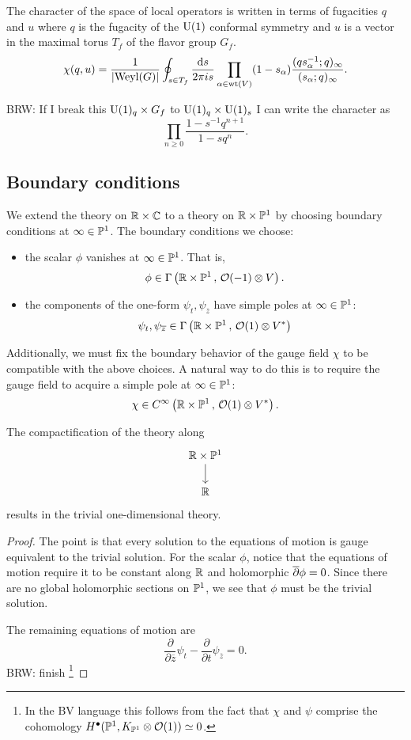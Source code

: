\documentclass[11pt]{amsart}
\def\zbar{{\overline{z}}}
\def\U{{\rm U}}
\def\brian#1{{\textcolor{blue!65!red}{BRW: {#1}}}}
\begin{document}
The character of the space of local operators is written in terms of fugacities $q$ and $u$ where $q$ is the fugacity of the $\U(1)$ conformal symmetry and $u$ is a vector in the maximal torus $T_f$ of the flavor group $G_f$. 
\[
\chi(q , u) = \frac{1}{|{\rm Weyl}(G)|} \oint_{s \in T_f} \frac{{\rm d} s}{2 \pi i s} \prod_{\alpha \in {\rm wt}(V)} (1-s_\alpha) \frac{(q s^{-1}_\alpha ; q)_\infty}{(s_\alpha ; q)_\infty} .
\]

\brian{If I break this $\U(1)_q \times G_f$ to $\U(1)_q \times \U(1)_s$ I can write the character as
\[
\prod_{n \geq 0} \frac{1 - s^{-1} q^{n+1}}{1 - s q^n} .
\]
}

\subsection*{Boundary conditions}

We extend the theory on $\mathbb R \times \mathbb C$ to a theory on $\mathbb R \times \mathbb P^1$ by choosing boundary conditions at $\infty \in \mathbb P^1$.  
The boundary conditions we choose:
\begin{itemize}
\item the scalar $\phi$ vanishes at $\infty \in \mathbb P^1$. 
That is, 
\[
\phi \in \Gamma \left(\mathbb R \times \mathbb P^1 \, , \, \mathcal O(-1) \otimes V \right) .
\]
\item the components of the one-form $\psi_{t}, \psi_{\zbar}$ have simple poles at $\infty \in \mathbb P^1$:
\[
\psi_{t}, \psi_{\zbar}\in \Gamma\left(\RR \times \PP^1 \, , \, \cO(1) \otimes V^*\right)
\]
\end{itemize}

Additionally, we must fix the boundary behavior of the gauge field $\chi$ to be compatible with the above choices.
A natural way to do this is to require the gauge field to acquire a simple pole at $\infty \in \mathbb P^1$:
\[
\chi \in C^\infty\left(\mathbb R \times \mathbb P^1 \, , \, \mathcal O(1) \otimes V^*\right) .
\]

\begin{lem}
The compactification of the theory along 
\[
\begin{tikzcd}
\RR \times \PP^1 \ar[d] \\ \RR
\end{tikzcd}
\]
results in the trivial one-dimensional theory. 
\end{lem}
\begin{proof}
The point is that every solution to the equations of motion is gauge equivalent to the trivial solution. 
For the scalar $\phi$, notice that the equations of motion require it to be constant along $\mathbb R$ and holomorphic $\overline{\partial} \phi = 0$. 
Since there are no global holomorphic sections on $\mathbb P^1$, we see that $\phi$ must be the trivial solution. 

The remaining equations of motion are
\[
\frac{\partial}{\partial \zbar} \psi_t - \frac{\partial}{\partial t} \psi_\zbar = 0 .
\]
\brian{finish} \footnote{In the BV language this follows from the fact that $\chi$ and $\psi$ comprise the cohomology $H^\bullet(\mathbb P^1, K_{\mathbb P^1} \otimes \mathcal O(1))\simeq 0$.}


\end{proof}
\end{document}
